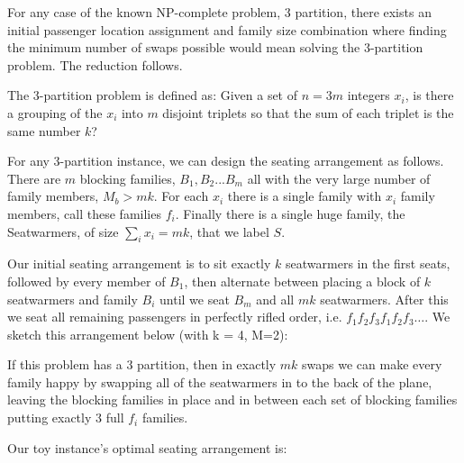 \documentclass[a4paper]{article}
\begin{document}
For any case of the known NP-complete problem, 3 partition, there exists an initial passenger location assignment and family size combination where finding the minimum number of swaps possible would mean solving the 3-partition problem.  The reduction follows.

The 3-partition problem is defined as: Given a set of $n = 3m$ integers $x_i$, is there a grouping of the $x_i$ into $m$ disjoint triplets so that the sum of each triplet is the same number $k$?

For any 3-partition instance, we can design the seating arrangement as follows.  There are $m$ blocking families, $B_1, B_2... B_m$ all with the very large number of family members, $M_b > mk$.  For each $x_i$ there is a single family with $x_i$ family members, call these families $f_i$.  Finally there is a single huge family, the Seatwarmers, of size $\sum_i x_i = mk$, that we label $S$.

Our initial seating arrangement is to sit exactly $k$ seatwarmers in the first seats, followed by every member of $B_1$, then alternate between placing a block of $k$ seatwarmers and family $B_i$ until we seat $B_m$ and all $mk$ seatwarmers.  After this we seat all remaining passengers in perfectly rifled order, i.e. $f_1 f_2 f_3 f_1 f_2 f_3 \hdots$.  We sketch this arrangement below (with k = 4, M=2):

\begin{figure}[H]
\centering
{}
\end{figure}

If this problem has a 3 partition, then in exactly $mk$ swaps we can make every family happy by swapping all of the seatwarmers in to the back of the plane, leaving the blocking families in place and in between each set of blocking families putting exactly 3 full $f_i$ families.  

Our toy instance's optimal seating arrangement is:
\end{document}
